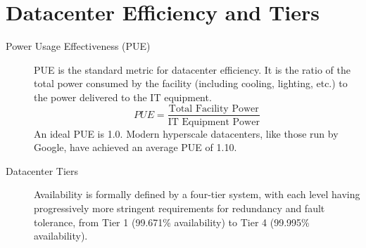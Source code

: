 \section{Datacenter Efficiency and Tiers}
\begin{description}
    \item[Power Usage Effectiveness (PUE)] PUE is the standard metric for datacenter efficiency. It is the ratio of the total power consumed by the facility (including cooling, lighting, etc.) to the power delivered to the IT equipment.
    \begin{equation}
        PUE = \frac{\text{Total Facility Power}}{\text{IT Equipment Power}}
    \end{equation}
    An ideal PUE is 1.0. Modern hyperscale datacenters, like those run by Google, have achieved an average PUE of 1.10.
    
    \item[Datacenter Tiers] Availability is formally defined by a four-tier system, with each level having progressively more stringent requirements for redundancy and fault tolerance, from Tier 1 (99.671\% availability) to Tier 4 (99.995\% availability).
\end{description}
